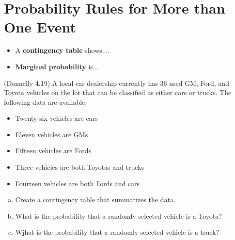 \documentclass[12pt, letterpaper]{article}
\newcounter{exercise}
\theoremstyle{definition}
\begin{document}
\newpage

\section*{Probability Rules for More than One Event} 

\begin{defn}
\begin{itemize}

\item A \textbf{contingency table} shows....

\vspace*{.7in}

\item \textbf{Marginal probability} is...

\vspace*{.7in}

\end{itemize}
\end{defn}

\begin{exercise}
(Donnelly 4.19)  A local car dealership currently has $36$ used GM, Ford, and Toyota vehicles on the lot that can be classified as either cars or trucks.  The following data are available:
\begin{itemize}
\item Twenty-six vehicles are cars
\item Eleven vehicles are GMs
\item Fifteen vehicles are Fords
\item Three vehicles are both Toyotas and trucks
\item Fourteen vehicles are both Fords and cars
\end{itemize}
\end{exercise}

\begin{enumerate}[(a)]

\item Create a contingency table that summarizes the data.

\vfill
\vfill
\vfill

\item What is the probability that a randomly selected vehicle is a Toyota?

\vfill

\item Wjhat is the probability that a randomly selected vehicle is a truck?

\vfill

\end{enumerate}
\end{document}
